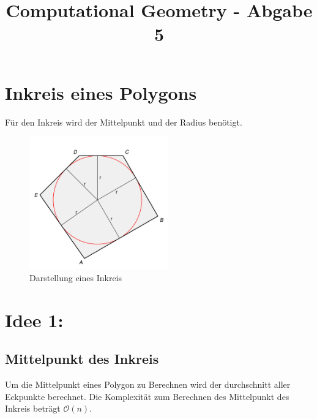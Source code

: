 \documentclass[conference]{IEEEtran}
\begin{document}
	
	\title{Computational Geometry - Abgabe 5}
	
	\author{
	}
	
	\maketitle
	
	

	\section{Inkreis eines Polygons}
	Für den Inkreis wird der Mittelpunkt und der Radius benötigt.
	\begin{figure}[h]
		\begin{center}
			\includegraphics[width=6cm]{Pentagon-inscribed-circle.svg.png}
			\caption{Darstellung eines Inkreis \cite{b1}}
			\label{inkreis}
		\end{center}
	\end{figure}
	
	\section{Idee 1:}
	\subsection{Mittelpunkt des Inkreis}
	Um die Mittelpunkt eines Polygon zu Berechnen wird der durchschnitt aller Eckpunkte berechnet.
	Die Komplexität zum Berechnen des Mittelpunkt des Inkreis beträgt $\mathcal{O}(n)$. 
\end{document}
